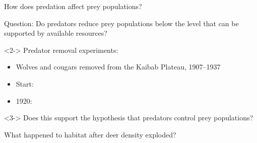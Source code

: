 \begin{frame}[t]
    \begin{adjustwidth}{-2em}{-1.5em}
        How does predation affect prey populations?

        \vspace{2mm}
        Question: Do predators reduce prey populations below the level that can
        be supported by available resources?

        \vspace{2mm}
        \begin{uncoverenv}<2->
        Predator removal experiments:
        \begin{itemize}
            \item Wolves and cougars removed from the Kaibab Plateau, 1907--1937

            \vspace{5mm}
            \item Start:
                

            \vspace{5mm}
            \item 1920:
                

        \end{itemize}
        \end{uncoverenv}

        \begin{uncoverenv}<3->
        Does this support the hypothesis that predators control prey
        populations?


        What happened to habitat after deer density exploded?


        \end{uncoverenv}

    \end{adjustwidth}
\end{frame}

